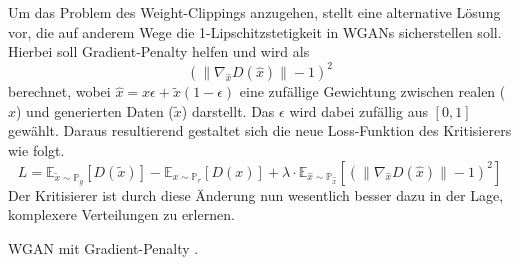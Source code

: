 \documentclass{hsflensburg}
\begin{document}
  Um das Problem des Weight-Clippings anzugehen, stellt
  \cite{gulrajani2017improved} eine alternative Lösung vor, die auf anderem Wege
  die 1-Lipschitzstetigkeit in WGANs sicherstellen soll. Hierbei soll
  Gradient-Penalty helfen und wird als
  \[
    (\|\nabla_{\hat{x}} D(\hat{x})\| - 1)^2
  \]
  berechnet, wobei $\hat{x} =  x \epsilon + \tilde{x}(1 - \epsilon)$ eine
  zufällige Gewichtung zwischen realen ($x$) und generierten Daten ($\tilde{x}$)
  darstellt. Das $\epsilon$ wird dabei zufällig aus $\left[0, 1\right]$ gewählt.
  Daraus resultierend gestaltet sich die neue Loss-Funktion des Kritisierers wie
  folgt.
  \[
    L = \mathbb{E}_{\tilde{x} \sim \mathbb{P}_g}\left[D(\tilde{x})\right] -
        \mathbb{E}_{x \sim \mathbb{P}_r}\left[D(x)\right] +
        \lambda \cdot \mathbb{E}_{\hat{x} \sim \mathbb{P}_{\hat{x}}}\left[(\|\nabla_{\hat{x}} D(\hat{x})\| - 1)^2\right]
  \]
  Der Kritisierer ist durch diese Änderung nun wesentlich besser dazu in der
  Lage, komplexere Verteilungen zu erlernen.

  \begin{algorithm}
    \caption{WGAN mit Gradient-Penalty \cite{gulrajani2017improved}.}
    \BlankLine
  \end{algorithm}
\end{document}
